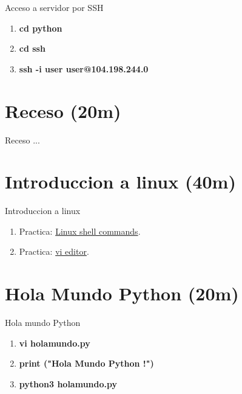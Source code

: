 \documentclass{beamer}
\begin{document}
\begin{frame}


Acceso a servidor por SSH

\begin{enumerate}
\item
	\textbf{cd python}
\item
	\textbf{cd ssh}
\item
	\textbf{ssh -i user user@104.198.244.0}
\end{enumerate} 


\end{frame}


\section{Receso (20m) }

\begin{frame}


Receso ...


\end{frame}


\section{Introduccion a linux (40m) }

\begin{frame}


Introduccion a linux

\begin{enumerate}
\item
	 
	Practica: \href{https://github.com/adsoftsito/python/blob/master/w1/linuxcommands.pdf}{Linux shell commands}.
	
    
\item
	Practica: \href{https://github.com/adsoftsito/python/blob/master/w1/vi-editor.pdf}{vi editor}.

\end{enumerate} 


\end{frame}


\section{Hola Mundo Python (20m) }

\begin{frame}


Hola mundo Python

\begin{enumerate}
\item
	\textbf{vi holamundo.py}
    
\item
	\textbf{print ("Hola Mundo Python !")}


\item
	\textbf{python3 holamundo.py}
	
\end{enumerate} 


\end{frame}
\end{document}
